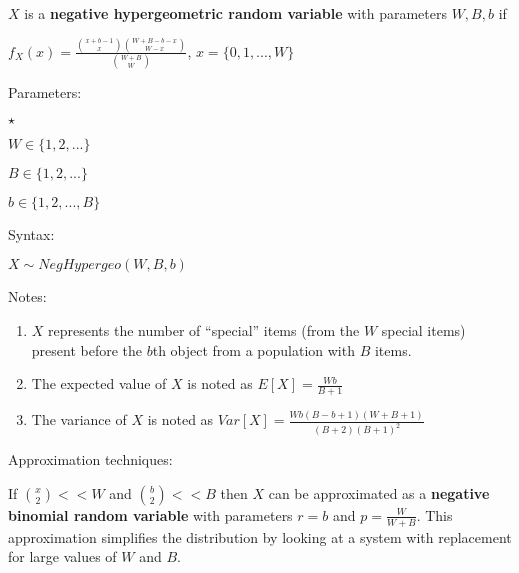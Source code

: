 \documentclass[12pt]{article}
\begin{document}
 $X$ is a \textbf{negative hypergeometric random variable} with parameters \textbf{$W, B, b$} if

$f_X(x) = \frac{ { x+b-1 \choose x} {W+B-b-x \choose W-x} }{ {W+B \choose W} }$, $x=\{0,1,...,W\}$

Parameters:

\begin{list}{$\star$ }{}
\item $W \in \{1,2,...\}$
\item $B \in \{1,2,...\}$
\item $b \in \{1,2,...,B\}$
\end{list}

Syntax:

$X\sim NegHypergeo(W,B,b)$

Notes:

\begin{enumerate}
\item $X$ represents the number of ``special'' items (from the $W$ special items) present before the $b$th object from a population with $B$ items.
\item The expected value of $X$ is noted as $E[X] = \frac{Wb}{B+1}$
\item The variance of $X$ is noted as $Var[X] = \frac{Wb(B-b+1)(W+B+1)}{(B+2)(B+1)^2}$
\end{enumerate}

Approximation techniques:

If ${x \choose 2} << W$ and ${b \choose 2} << B$ then $X$ can be approximated as a \textbf{negative binomial random variable} with parameters $r = b$ and $p = \frac{W}{W+B}$.
This approximation simplifies the distribution by looking at a system with replacement for large values of $W$ and $B$.
\end{document}
